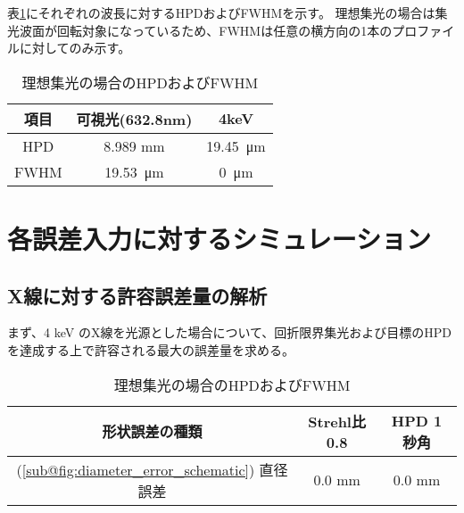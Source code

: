 表\ref{tb:ideal_focus_evaluation}にそれぞれの波長に対するHPDおよびFWHMを示す。
理想集光の場合は集光波面が回転対象になっているため、FWHMは任意の横方向の1本のプロファイルに対してのみ示す。

\begin{table}[!ht]
\begin{center}
  \begin{tabular}{|c|c|c|} \hline
    項目 & 可視光(632.8nm) & 4keV \\ \hline
    HPD & 8.989 mm & \SI{19.45}{\micro \metre} \\
    FWHM & \SI{19.53}{\micro \metre} & \SI{0}{\micro \metre} \\ \hline
  \end{tabular}
  \caption{理想集光の場合のHPDおよびFWHM}
  \label{tb:ideal_focus_evaluation}
\end{center}
\end{table}

\clearpage
\newpage

\section{各誤差入力に対するシミュレーション}
\label{chap2_simulation_error_response}

\subsection{X線に対する許容誤差量の解析}
\label{chap2_xray_allowed_error}

まず、4 keV のX線を光源とした場合について、回折限界集光および目標のHPDを達成する上で許容される最大の誤差量を求める。

\begin{table}[!ht]
\begin{center}
  \begin{tabular}{|c|c|c|} \hline
    形状誤差の種類 & Strehl比0.8 & HPD 1 秒角 \\ \hline
    (\ref{sub@fig:diameter_error_schematic}) 直径誤差 & 0.0 mm & 0.0 mm
  \end{tabular}
  \caption{理想集光の場合のHPDおよびFWHM}
  \label{tb:xray_allowed_error}
\end{center}
\end{table}


\clearpage
\newpage
